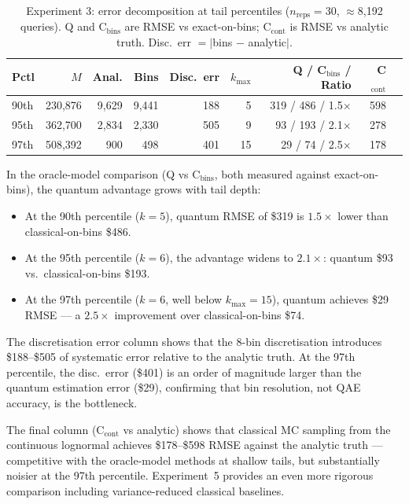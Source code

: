 \documentclass[11pt,a4paper]{article}
\begin{document}
\begin{table}[ht]
\centering
\caption{Experiment 3: error decomposition at tail percentiles ($n_{\text{reps}} = 30$, $\approx$8{,}192 queries). Q and C$_{\text{bins}}$ are RMSE vs exact-on-bins; C$_{\text{cont}}$ is RMSE vs analytic truth. Disc.\ err $= |$bins $-$ analytic$|$.}
\label{tab:exp3}
\small
\begin{tabular}{lrrrrrrrr}
\toprule
Pctl & $M$ & Anal. & Bins & Disc.\ err & $k_{\max}$ & Q / C$_{\text{bins}}$ / Ratio & C$_{\text{cont}}$ \\
\midrule
90th & 230{,}876 & 9{,}629 & 9{,}441 & 188 & 5 & 319 / 486 / 1.5$\times$ & 598 \\
95th & 362{,}700 & 2{,}834 & 2{,}330 & 505 & 9 &  93 / 193 / 2.1$\times$ & 278 \\
97th & 508{,}392 &   900 &   498 & 401 & 15 &  29 /  74 / 2.5$\times$ & 178 \\
\bottomrule
\end{tabular}
\end{table}

In the oracle-model comparison (Q vs C$_{\text{bins}}$, both measured against exact-on-bins), the quantum advantage grows with tail depth:

\begin{itemize}[nosep]
\item At the 90th percentile ($k = 5$), quantum RMSE of \$319 is $1.5\times$ lower than classical-on-bins \$486.
\item At the 95th percentile ($k = 6$), the advantage widens to $2.1\times$: quantum \$93 vs.\ classical-on-bins \$193.
\item At the 97th percentile ($k = 6$, well below $k_{\max} = 15$), quantum achieves \$29 RMSE --- a $2.5\times$ improvement over classical-on-bins \$74.
\end{itemize}

\noindent The discretisation error column shows that the 8-bin discretisation introduces \$188--\$505 of systematic error relative to the analytic truth. At the 97th percentile, the disc.\ error (\$401) is an order of magnitude larger than the quantum estimation error (\$29), confirming that bin resolution, not QAE accuracy, is the bottleneck.

The final column (C$_{\text{cont}}$ vs analytic) shows that classical MC sampling from the continuous lognormal achieves \$178--\$598 RMSE against the analytic truth --- competitive with the oracle-model methods at shallow tails, but substantially noisier at the 97th percentile. Experiment~5 provides an even more rigorous comparison including variance-reduced classical baselines.
\end{document}
